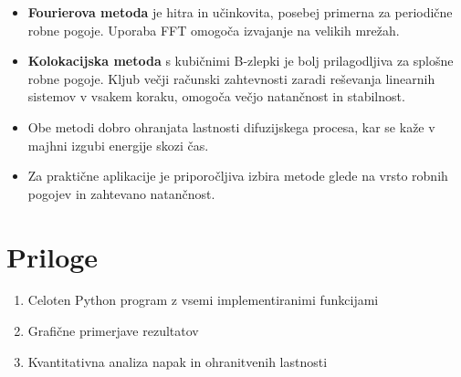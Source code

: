 \documentclass[12pt,a4paper]{article}
\begin{document}
\begin{itemize}
    \item \textbf{Fourierova metoda} je hitra in učinkovita, posebej primerna za periodične robne pogoje. Uporaba FFT omogoča izvajanje na velikih mrežah.
    
    \item \textbf{Kolokacijska metoda} s kubičnimi B-zlepki je bolj prilagodljiva za splošne robne pogoje. Kljub večji računski zahtevnosti zaradi reševanja linearnih sistemov v vsakem koraku, omogoča večjo natančnost in stabilnost.
    
    \item Obe metodi dobro ohranjata lastnosti difuzijskega procesa, kar se kaže v majhni izgubi energije skozi čas.
    
    \item Za praktične aplikacije je priporočljiva izbira metode glede na vrsto robnih pogojev in zahtevano natančnost.
\end{itemize}

\section{Priloge}

\begin{enumerate}
    \item Celoten Python program z vsemi implementiranimi funkcijami
    \item Grafične primerjave rezultatov
    \item Kvantitativna analiza napak in ohranitvenih lastnosti
\end{enumerate}
\end{document}
